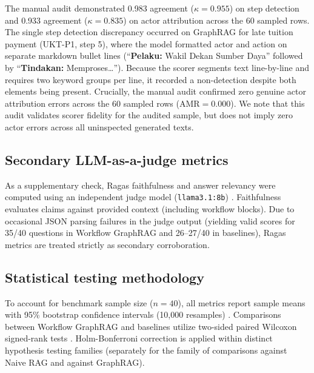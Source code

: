 \documentclass[preprint,10pt]{elsarticle}
\begin{document}
\begin{table}[!htbp]
\centering
\caption{Manual audit of deterministic step-alignment scorer across 60 sampled rows (Naive RAG, GraphRAG, and Workflow GraphRAG).}
\label{tab:audit}
\small

\end{table}

The manual audit demonstrated 0.983 agreement ($\kappa=0.955$) on step detection and 0.933 agreement ($\kappa=0.835$) on actor attribution across the 60 sampled rows. The single step detection discrepancy occurred on GraphRAG for late tuition payment (UKT-P1, step 5), where the model formatted actor and action on separate markdown bullet lines (``\textbf{Pelaku:} Wakil Dekan Sumber Daya'' followed by ``\textbf{Tindakan:} Memproses\dots''). Because the scorer segments text line-by-line and requires two keyword groups per line, it recorded a non-detection despite both elements being present. Crucially, the manual audit confirmed zero genuine actor attribution errors across the 60 sampled rows ($\text{AMR} = 0.000$). We note that this audit validates scorer fidelity for the audited sample, but does not imply zero actor errors across all uninspected generated texts.

\subsection{Secondary LLM-as-a-judge metrics}
As a supplementary check, Ragas faithfulness and answer relevancy \cite{es2024ragas} were computed using an independent judge model (\texttt{llama3.1:8b}) \cite{zheng2023judging}. Faithfulness evaluates claims against provided context (including workflow blocks). Due to occasional JSON parsing failures in the judge output (yielding valid scores for 35/40 questions in Workflow GraphRAG and 26--27/40 in baselines), Ragas metrics are treated strictly as secondary corroboration.

\subsection{Statistical testing methodology}
To account for benchmark sample size ($n=40$), all metrics report sample means with 95\% bootstrap confidence intervals (10,000 resamples) \cite{efron1993bootstrap}. Comparisons between Workflow GraphRAG and baselines utilize two-sided paired Wilcoxon signed-rank tests \cite{wilcoxon1945}. Holm-Bonferroni correction \cite{holm1979} is applied within distinct hypothesis testing families (separately for the family of comparisons against Naive RAG and against GraphRAG).
\end{document}
